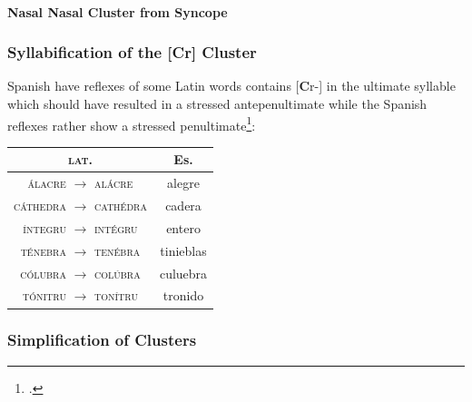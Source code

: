 \documentclass{report}[12pt]
\begin{document}
\paragraph*{Nasal Nasal Cluster from Syncope}

\subsubsection{Syllabification of the [Cr] Cluster}

Spanish have reflexes of some Latin words contains [\textbf{C}r-] in the ultimate syllable which should have resulted in a stressed antepenultimate while the Spanish reflexes rather show a stressed penultimate\footcite[p.~115]{lloyd_spanish}:
\begin{center}
  \begin{tabular}{c c}
  \textsc{lat.} & Es. \\
  \hline
  \textsc{\'{a}lacre} $\rightarrow$ \textsc{al\'{a}cre} & alegre \\
  \textsc{c\'{a}thedra} $\rightarrow$ \textsc{cath\'{e}dra} & cadera \\
  \textsc{\'{i}ntegru} $\rightarrow$ \textsc{int\'{e}gru} & entero \\
  \textsc{t\'{e}nebra} $\rightarrow$ \textsc{ten\'{e}bra} & tinieblas \\
  \textsc{c\'{o}lubra} $\rightarrow$ \textsc{col\'{u}bra} & culuebra \\
  \textsc{t\'{o}nitru} $\rightarrow$ \textsc{ton\'{i}tru} & tronido \\
  \end{tabular}
\end{center}

\subsubsection{Simplification of Clusters}

\begin{tcolorbox}
  
\end{tcolorbox}

\pagebreak
\end{document}
